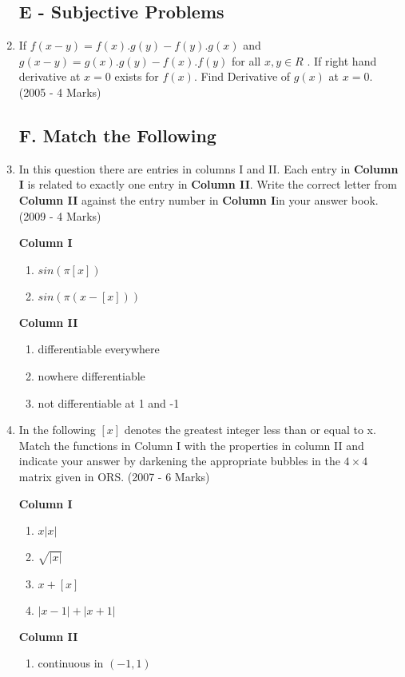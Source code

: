 \documentclass[journal,12pt,twocolumn]{IEEEtran}
\theoremstyle{remark}
\begin{document}
\begin{enumerate}
\subsection*{E - Subjective Problems}
    \item If $f(x-y)=f(x).g(y)-f(y).g(x)$ and $ g(x-y)=g(x).g(y)-f(x).f(y) $ for all $x,y \in R $ . If right hand derivative at $x=0$ exists for $f(x)$. Find Derivative of $g(x)$ at $x=0$.
    \hfill(2005 - 4 Marks)
\subsection*{F.  Match the Following}
		 \item In this question there are entries in columns I and II. Each entry in \textbf{Column I} is related to exactly one entry in \textbf{Column II}. Write the correct letter from \textbf{Column II} against the entry number in \textbf{Column I}in your answer book.      \hfill(2009 - 4 Marks)
			\begin{multicols}{2}
                 \textbf{Column I}
				\begin{enumerate}[label=(\Alph*)]
				\item	$sin(\pi[x])$
				\item $sin(\pi(x-[x]))$
				\end{enumerate}
			\columnbreak
                 \textbf{Column II}
				\begin{enumerate}[label=(\alph*), start=16]
					\item  differentiable everywhere 
						
					\item  nowhere differentiable

					\item  not differentiable at 1 and -1  
						
				\end{enumerate}
				\end{multicols}
			\item In the following $[x]$ denotes the greatest integer less than or equal to x. Match the functions in Column I with the properties in column II and indicate your answer by darkening the appropriate bubbles in the $4\times4$ matrix given in ORS.
                  \hfill(2007 - 6 Marks)
			\begin{multicols}{2}
				\textbf{Column I}

				\begin{enumerate}[label=(\Alph*)]
					\item  $x|x|$ 
					\item  $\sqrt{|x|}$ 
					\item $x+[x]$ 
					\item  $|x-1|+|x+1|$
				\end{enumerate}
			\columnbreak
				\textbf{Column II}
				\begin{enumerate}[label=(\alph*), start=16]
					\item  continuous in $(-1,1)$


\end{enumerate}
\end{multicols}
\end{enumerate}
\end{document}
